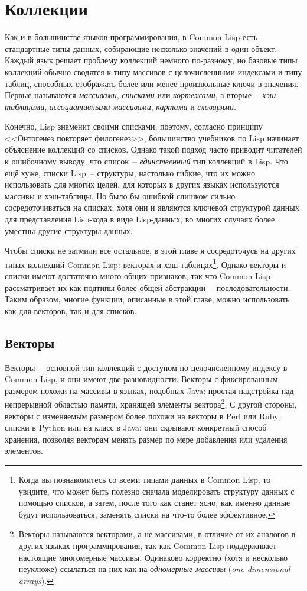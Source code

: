 \chapter{Коллекции}
\label{ch:11}

Как и в большинстве языков программирования, в Common Lisp есть стандартные типы данных,
собирающие несколько значений в один объект.  Каждый язык решает проблему коллекций
немного по-разному, но базовые типы коллекций обычно сводятся к типу массивов с целочисленными
индексами и типу таблиц, способных отображать более или менее
произвольные ключи в значения.  Первые называются \textit{массивами}, \textit{списками} или \textit{кортежами}, а
вторые~-- \textit{хэш-таблицами}, \textit{ассоциативными массивами}, \textit{картами} и \textit{словарями}.

Конечно, Lisp знаменит своими списками, поэтому, согласно принципу <<Онтогенез повторяет
филогенез>>, большинство учебников по Lisp начинает объяснение коллекций со
списков. Однако такой подход часто приводит читателей к ошибочному выводу, что
список~-- \textit{единственный} тип коллекций в Lisp.  Что ещё хуже,
списки Lisp~-- структуры, настолько гибкие, что их можно использовать для многих целей, для
которых в других языках используются массивы и хэш-таблицы.  Но было бы ошибкой слишком
сильно сосредоточиваться на списках; хотя они и являются ключевой структурой данных для
представления Lisp-кода в виде Lisp-данных, во многих случаях более уместны другие структуры данных.

Чтобы списки не затмили всё остальное, в этой главе я сосредоточусь на других типах
коллекций Common Lisp: векторах и хэш-таблицах\footnote{Когда вы познакомитесь со всеми
  типами данных в Common Lisp, то увидите, что может быть полезно сначала моделировать
  структуру данных с помощью списков, а затем, после того как станет ясно, как именно данные
  будут использоваться, заменять списки на что-то более эффективное.}.
Однако векторы и списки имеют достаточно много общих признаков, так что Common Lisp
рассматривает их как подтипы более общей абстракции~-- последовательности.  Таким образом,
многие функции, описанные в этой главе, можно использовать как для векторов, так и для
списков.

\section{Векторы}

Векторы~-- основной тип коллекций с доступом по целочисленному индексу в Common Lisp, и они
имеют две разновидности.  Векторы с фиксированным размером похожи на массивы в языках,
подобных Java: простая надстройка над непрерывной областью памяти, хранящей элементы
вектора\footnote{Векторы называются векторами, а не массивами, в отличие от их аналогов в других
  языках программирования, так как Common Lisp поддерживает настоящие многомерные
  массивы.  Одинаково корректно (хотя и несколько неуклюже) ссылаться на них как на
  \textit{одномерные массивы} (\textit{one-dimensional arrays}).}. С другой стороны,
векторы с изменяемым размером более похожи на векторы в Perl или Ruby, списки в Python
или на класс  в Java: они скрывают конкретный способ хранения, позволяя
векторам менять размер по мере добавления или удаления элементов.

